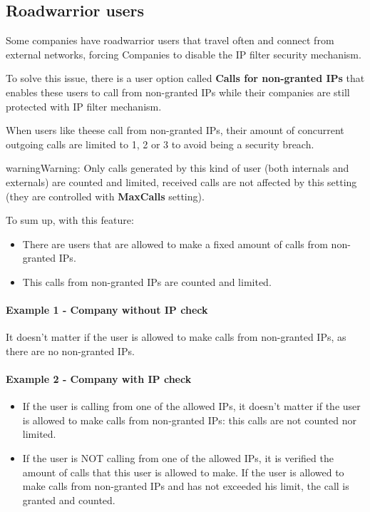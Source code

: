 \documentclass[letterpaper,10pt,english]{sphinxmanual}
\begin{document}
\subsection{Roadwarrior users}
\label{security/index:roadwarrior-users}\label{security/index:id1}
Some companies have roadwarrior users that travel often and connect from external
networks, forcing Companies to disable the IP filter security mechanism.

To solve this issue, there is a user option called \textbf{Calls for non-granted IPs}
that enables these users to call from non-granted IPs while their companies are
still protected with IP filter mechanism.

When users like theese call from non-granted IPs, their amount of concurrent
outgoing calls are limited to 1, 2 or 3 to avoid being a security breach.

\begin{notice}{warning}{Warning:}
Only calls generated by this kind of user (both internals and
externals) are counted and limited, received calls are not affected
by this setting (they are controlled with \textbf{MaxCalls} setting).
\end{notice}

To sum up, with this feature:
\begin{itemize}
\item {} 
There are users that are allowed to make a fixed amount of calls from
non-granted IPs.

\item {} 
This calls from non-granted IPs are counted and limited.

\end{itemize}
\paragraph{Example 1 - Company without IP check}

It doesn't matter if the user is allowed to make calls from non-granted IPs,
as there are no non-granted IPs.
\paragraph{Example 2 - Company with IP check}
\begin{itemize}
\item {} 
If the user is calling from one of the allowed IPs,
it doesn't matter if the user is allowed to make calls from non-granted IPs:
this calls are not counted nor limited.

\item {} 
If the user is NOT calling from one of the allowed IPs, it is verified the
amount of calls that this user is allowed to make. If the user is allowed to
make calls from non-granted IPs and has not exceeded his limit, the call is
granted and counted.

\end{itemize}
\end{document}
